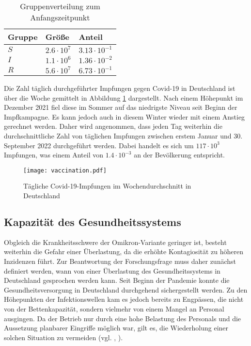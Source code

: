 \documentclass[../main.tex]{subfiles}
\begin{document}
    \begin{table}[h]
        \centering
        \begin{tabularx}{\textwidth}{X | X | X}
            \textbf{Gruppe} & \textbf{Größe} & \textbf{Anteil} \\ \hline
            $S$ & $2.6 \cdot 10^7$ & $3.13 \cdot 10^{-1}$ \\ \hline
            $I$ & $1.1 \cdot 10^6$ & $1.36 \cdot 10^{-2}$\\ \hline
            $R$ & $5.6 \cdot 10^7$ & $6.73 \cdot 10^{-1}$
        \end{tabularx}
        \caption{Gruppenverteilung zum Anfangszeitpunkt}
        \label{tab:initial_state}
    \end{table}

    Die Zahl täglich durchgeführter Impfungen gegen Covid-19 in Deutschland ist über die Woche gemittelt in Abbildung \ref{fig:vaccinations} dargestellt. Nach einem Höhepunkt im Dezember 2021 fiel diese im Sommer auf das niedrigste Niveau seit Beginn der Impfkampagne. Es kann jedoch auch in diesem Winter wieder mit einem Anstieg gerechnet werden. Daher wird angenommen, dass jeden Tag weiterhin die durchschnittliche Zahl von täglichen Impfungen zwischen erstem Januar und 30. September 2022 durchgeführt werden. Dabei handelt es sich um $117\cdot 10^3$ Impfungen, was einem Anteil von $1.4 \cdot 10^{-3}$ an der Bevölkerung entspricht.

    \begin{figure}[t]
        \texttt{[image: vaccination.pdf]}
        \caption[Tägliche Covid-19-Impfungen in Deutschland]{Tägliche Covid-19-Impfungen im Wochendurchschnitt in Deutschland}
        \label{fig:vaccinations}
    \end{figure}

    \subsection{Kapazität des Gesundheitssystems}
    \label{ssec:capacity_health_system}
    Obgleich die Krankheitsschwere der Omikron-Variante geringer ist, besteht weiterhin die Gefahr einer Überlastung, da die erhöhte Kontagiosität zu höheren Inzidenzen führt. Zur Beantwortung der Forschungsfrage muss daher zunächst definiert werden, wann von einer Überlastung des Gesundheitssystems in Deutschland gesprochen werden kann. 
    Seit Beginn der Pandemie konnte die Gesundheitsversorgung in Deutschland durchgehend sichergestellt werden. Zu den Höhepunkten der Infektionswellen kam es jedoch bereits zu Engpässen, die nicht von der Bettenkapazität, sondern vielmehr von einem Mangel an Personal ausgingen. Da der Betrieb nur durch eine hohe Belastung des Personals und die Aussetzung planbarer Eingriffe möglich war, gilt es, die Wiederholung einer solchen Situation zu vermeiden (vgl. \cite[S. 4]{Pri+21}, \cite[S. 87,89]{Cac21}).
    
\end{document}
